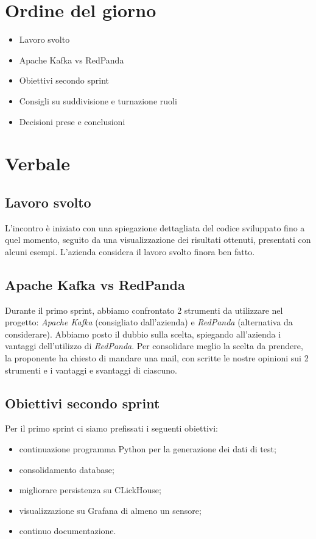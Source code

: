 \documentclass[italian,12pt]{article}
\begin{document}
\section{Ordine del giorno}
\begin{itemize}
	\item Lavoro svolto
	\item Apache Kafka vs RedPanda
	\item Obiettivi secondo sprint
	\item Consigli su suddivisione e turnazione ruoli
	\item Decisioni prese e conclusioni
\end{itemize}

\newpage

\section{Verbale}

\subsection{Lavoro svolto}
L'incontro è iniziato con una spiegazione dettagliata del codice sviluppato fino a quel momento, seguito da una visualizzazione dei risultati ottenuti, presentati con alcuni esempi.
L'azienda considera il lavoro svolto finora ben fatto.

\subsection{Apache Kafka vs RedPanda}
Durante il primo sprint, abbiamo confrontato 2 strumenti da utilizzare nel progetto: \textit{Apache Kafka} (consigliato dall'azienda) e \textit{RedPanda} (alternativa da considerare).
Abbiamo posto il dubbio sulla scelta, spiegando all'azienda i vantaggi dell'utilizzo di \textit{RedPanda}.
Per consolidare meglio la scelta da prendere, la proponente ha chiesto di mandare una mail, con scritte le nostre opinioni sui 2 strumenti e i vantaggi e svantaggi di ciascuno.

\subsection{Obiettivi secondo sprint}
Per il primo sprint ci siamo preﬁssati i seguenti obiettivi:
\begin{itemize}
	\item continuazione programma Python per la generazione dei dati di test;
	\item consolidamento database;
	\item migliorare persistenza su CLickHouse;
	\item visualizzazione su Grafana di almeno un sensore;
	\item continuo documentazione.
\end{itemize}
\end{document}
